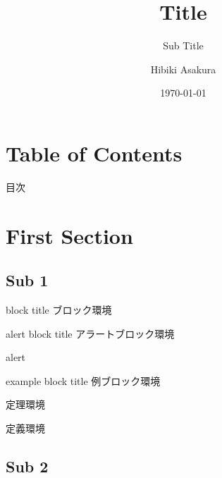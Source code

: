 \documentclass[9pt,xcolor=dvipsnames,dvipdfmx]{beamer}
\title{Title}
\subtitle{Sub Title}
\author[H.Asakura]{Hibiki Asakura}
\institute[Kyoto Univ.]{Kyoto University}
\date{\today}
\begin{document}
\begin{frame}[noframenumbering]
  \titlepage
\end{frame}

\section*{Table of Contents}

\begin{frame}{目次}
    \tableofcontents[hideallsubsections]
\end{frame}

\section{First Section}
\subsection{Sub 1}

\begin{frame}[label=1-1frame]{\subsecname}
\begin{block}{block title}
    ブロック環境
\end{block}
\begin{alertblock}{alert block title}
    アラートブロック環境
\end{alertblock}
\alert{alert}\\
\begin{exampleblock}{example block title}
    例ブロック環境
\end{exampleblock}
\begin{theorem}
    定理環境
\end{theorem}
\begin{definition}
    定義環境
\end{definition}
\end{frame}

\subsection{Sub 2}
\end{document}
